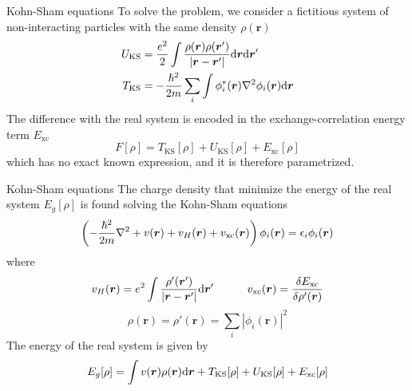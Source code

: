 \documentclass[11pt, xcolor=dvipsnames, aspectratio=43]{beamer}
\renewcommand{\vec}[1]{\mathbf{\boldsymbol{#1}}}
\newcommand{\rr}[1]{#1(\vec{r})}
\newcommand{\dr}{\differential \vec{r}}
\begin{document}
\begin{frame}{Kohn-Sham equations}
    To solve the problem, we consider a \alert{fictitious system of non-interacting particles} with the same density $\rho(\vec{r})$
    \begin{align*}
        U_\text{KS} & = \frac{e^2}{2} \int \frac{\rho(\vec{r})\rho(\vec{r}')}{|\vec{r}-\vec{r}'|}  \dr \dr' \\
        T_\text{KS} & = -\frac{\hslash^2}{2m}\sum_i \int \rr{\phi_i^*} \laplacian \rr{\phi_i} \dr
    \end{align*}
    \pause
    The difference with the real system is encoded in the exchange-correlation energy term \alert{$E_\text{xc}$}
    \begin{equation*}
        F[\rho]      = T_\text{KS}[\rho] + U_\text{KS}[\rho] + E_\text{xc}[\rho]
    \end{equation*}
    which has no exact known expression, and it is therefore parametrized.
\end{frame}

\begin{frame}{Kohn-Sham equations}
    The charge density that minimize the energy of the real system $E_g[\rho]$ is found solving the \alert{Kohn-Sham equations}
    \begin{equation*} \label{eq:kohn_sche}
        \left(-\frac{\hslash^2}{2m} \laplacian + \rr{v} + \rr{v_H} + \rr{v_\text{xc}} \right) \rr{\phi_i} = \epsilon_i \rr{\phi_i}
    \end{equation*}
    where
    \begin{equation*}
        \rr{v_H}          = e^2 \int \frac{\rho'(\vec{r}')}{|\vec{r}-\vec{r}'|} \dr' \qquad \quad
        \rr{v_\text{xc}}  =  \frac{\delta E_\text{xc}}{\delta\rr{\rho'}}
    \end{equation*}
    \begin{equation*} \label{eq:kohn_rho}
        \rr{\rho} = \rr{\rho'} = \sum_i |\rr{\phi_i}|^2
    \end{equation*}
    \pause
    The energy of the real system is given by
    \begin{equation*} \label{eq:ground_functional}
        E_g[\rho]  = \int v(\vec{r}) \rho(\vec{r}) \differential \vec{r} + T_\text{KS}[\rho] + U_\text{KS}[\rho] + E_\text{xc}[\rho]
    \end{equation*}
\end{frame}
\end{document}

